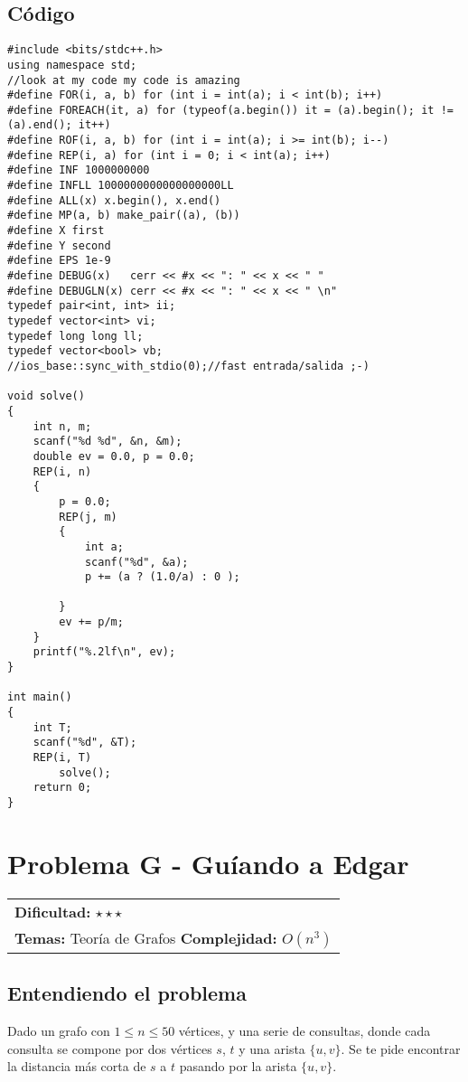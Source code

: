 \subsection*{Código}
\begin{verbatim}
#include <bits/stdc++.h>
using namespace std;
//look at my code my code is amazing
#define FOR(i, a, b) for (int i = int(a); i < int(b); i++)
#define FOREACH(it, a) for (typeof(a.begin()) it = (a).begin(); it != (a).end(); it++)
#define ROF(i, a, b) for (int i = int(a); i >= int(b); i--)
#define REP(i, a) for (int i = 0; i < int(a); i++)
#define INF 1000000000
#define INFLL 1000000000000000000LL
#define ALL(x) x.begin(), x.end()
#define MP(a, b) make_pair((a), (b))
#define X first
#define Y second
#define EPS 1e-9
#define DEBUG(x)   cerr << #x << ": " << x << " "
#define DEBUGLN(x) cerr << #x << ": " << x << " \n"
typedef pair<int, int> ii;
typedef vector<int> vi;
typedef long long ll;
typedef vector<bool> vb;
//ios_base::sync_with_stdio(0);//fast entrada/salida ;-)
 
void solve()
{
    int n, m;
    scanf("%d %d", &n, &m);
    double ev = 0.0, p = 0.0;
    REP(i, n)
    {
        p = 0.0;
        REP(j, m)
        {
            int a;
            scanf("%d", &a);
            p += (a ? (1.0/a) : 0 );
 
        }
        ev += p/m;
    }
    printf("%.2lf\n", ev);
}
 
int main()
{
    int T;
    scanf("%d", &T);
    REP(i, T)
        solve();
    return 0;
}
\end{verbatim}

\section{Problema G - Guíando a Edgar}

\hfill
\begin{tabular}{@{}l@{}}
\textbf{Dificultad:} $\star\star\star$ \\
\textbf{Temas:} Teoría de Grafos
\textbf{Complejidad:} $O(n^3)$
\end{tabular}

\subsection*{Entendiendo el problema}
Dado un grafo con $1 \leq n \leq 50$ vértices, y una serie de consultas, donde cada consulta se compone por dos vértices $s$, $t$ y una arista $\{u, v\}$. Se te pide encontrar la distancia más corta de $s$ a $t$ pasando por la arista $\{u, v\}$.
